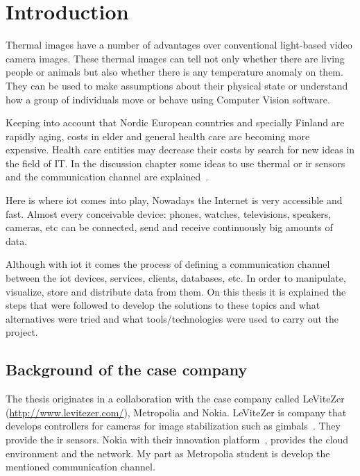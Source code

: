 \documentclass[hidelinks,11pt,a4paper,oneside,article]{memoir}
\begin{document}
\setcounter{page}{1} %
\ClearWallPaper

\sloppy %

\chapter{Introduction}\label{sec:introduction}


Thermal images have a number of advantages over conventional light-based video camera images.   These thermal images can tell not only whether there are living people or animals but also whether there is any temperature anomaly on them. They can be used to make assumptions about their physical state or understand how a group of individuals move or behave using Computer Vision software.

Keeping into account that Nordic European countries and specially Finland are rapidly aging, costs in elder and general health care are becoming more expensive. Health care entities may decrease their costs by search for new ideas in the field of IT. In the discussion chapter some ideas to use thermal or \gls{ir} sensors and the communication channel are explained~\cite{agingeuropa}.

Here is where \gls{iot} comes into play, Nowadays the Internet is very accessible and fast. Almost every conceivable device: phones, watches, televisions, speakers, cameras, etc can be connected, send and receive continuously big amounts of data.

Although with \gls{iot} it comes the process of defining a communication channel between the \gls{iot} devices, services, clients, databases, etc. In order to manipulate, visualize, store and distribute data from them. On this thesis it is explained the steps that were followed to develop the solutions to these topics and what alternatives were tried and what tools/technologies were used to carry out the project.


\section*{Background of the case company}
The thesis originates in a collaboration with the case company called LeViteZer (\url{http://www.levitezer.com/}), Metropolia and Nokia.
 LeViteZer is company that develops controllers for cameras for image stabilization such as gimbals~\cite{levitezer}. They provide the \gls{ir} sensors. Nokia with their innovation platform~\cite{nokiainnovation}, provides the cloud environment and the network. My part as Metropolia student is develop the mentioned communication channel.
\end{document}
